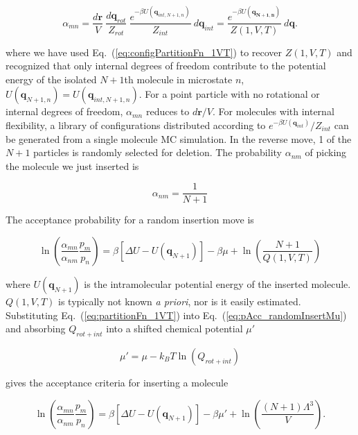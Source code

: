 \begin{equation}
\alpha_{mn} = \frac{d\mathbf{r}}{V}\ \frac{d\mathbf{q}_{rot}}{Z_{rot}}\ \frac{e^{-\beta U(\mathbf{q}_{int,N+1,n})}}{Z_{int}}\ d\mathbf{q}_{int} = \frac{e^{-\beta U(\mathbf{q_{N+1,n}})}}{Z(1,V,T)}\ d\mathbf{q}.
\end{equation}

where we have used Eq.\ (\ref{eq:configPartitionFn_1VT}) to recover $Z(1,V,T)$ and recognized that only internal degrees of freedom contribute to the potential energy of the isolated $N+1$th molecule in microstate $n$, $U(\mathbf{q}_{N+1,n}) = U(\mathbf{q}_{int,N+1,n})$. For a point particle with no rotational or internal degrees of freedom, $\alpha_{mn}$ reduces to $d\mathbf{r}/V$. For molecules with internal flexibility, a library of configurations distributed according to $e^{-\beta U(\mathbf{q}_{int})}/Z_{int}$ can be generated from a single molecule MC simulation. In the reverse move, 1 of the $N+1$ particles is randomly selected for deletion. The probability $\alpha_{nm}$ of picking the molecule we just inserted is

\begin{equation}
\alpha_{nm} = \frac{1}{N+1}
\end{equation}

The acceptance probability for a random insertion move is 

\begin{equation}
\label{eq:pAcc_randomInsertMu}
\ln\left( \frac{\alpha_{mn}}{\alpha_{nm}} \frac{p_m}{p_n} \right) = \beta \left[\Delta U - U(\mathbf{q}_{N+1})\right] - \beta \mu + \ln\left( \frac{N+1}{Q(1,V,T)} \right)
\end{equation}

where $U(\mathbf{q}_{N+1})$ is the intramolecular potential energy of the inserted molecule. $Q(1,V,T)$ is typically not known {\em a priori}, nor is it easily estimated. Substituting Eq.\ (\ref{eq:partitionFn_1VT}) into Eq.\ (\ref{eq:pAcc_randomInsertMu}) and absorbing $Q_{rot+int}$ into a shifted chemical potential $\mu'$

\begin{equation}
\mu' = \mu - k_BT\ln(Q_{rot+int})
\end{equation}

gives the acceptance criteria for inserting a molecule

\begin{equation}
\label{eq:pAcc_randomInsertMuShift}
\ln\left( \frac{\alpha_{mn}}{\alpha_{nm}} \frac{p_m}{p_n} \right) = \beta \left[\Delta U - U(\mathbf{q}_{N+1})\right] - \beta \mu' + \ln\left( \frac{(N+1)\Lambda^3}{V} \right).
\end{equation}


